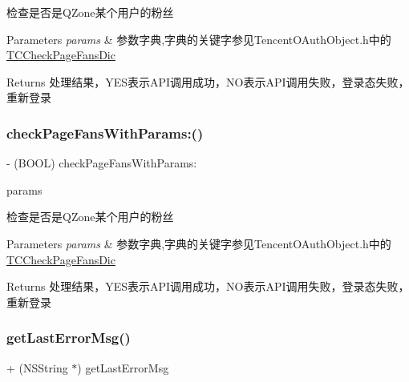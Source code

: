 检查是否是\+Q\+Zone某个用户的粉丝 
\begin{DoxyParams}{Parameters}
{\em params} & 参数字典,字典的关键字参见\+Tencent\+O\+Auth\+Object.\+h中的\mbox{\hyperlink{interface_t_c_check_page_fans_dic}{T\+C\+Check\+Page\+Fans\+Dic}} \\
\hline
\end{DoxyParams}
\begin{DoxyReturn}{Returns}
处理结果，\+Y\+E\+S表示\+A\+P\+I调用成功，\+N\+O表示\+A\+P\+I调用失败，登录态失败，重新登录 
\end{DoxyReturn}
\mbox{\label{interface_tencent_o_auth_aecd70d7b1b09dfce385f4b79f69450c3}} 
\subsubsection{\texorpdfstring{check\+Page\+Fans\+With\+Params\+:()}{checkPageFansWithParams:()}\hspace{0.1cm}{\footnotesize\ttfamily [2/2]}}
{\footnotesize\ttfamily -\/ (B\+O\+OL) check\+Page\+Fans\+With\+Params\+: \begin{DoxyParamCaption}\item[{(N\+S\+Mutable\+Dictionary $\ast$)}]{params }\end{DoxyParamCaption}}

检查是否是\+Q\+Zone某个用户的粉丝 
\begin{DoxyParams}{Parameters}
{\em params} & 参数字典,字典的关键字参见\+Tencent\+O\+Auth\+Object.\+h中的\mbox{\hyperlink{interface_t_c_check_page_fans_dic}{T\+C\+Check\+Page\+Fans\+Dic}} \\
\hline
\end{DoxyParams}
\begin{DoxyReturn}{Returns}
处理结果，\+Y\+E\+S表示\+A\+P\+I调用成功，\+N\+O表示\+A\+P\+I调用失败，登录态失败，重新登录 
\end{DoxyReturn}
\mbox{\label{interface_tencent_o_auth_ada49d962f50bfadf8b3a7eb96420c684}} 
\subsubsection{\texorpdfstring{get\+Last\+Error\+Msg()}{getLastErrorMsg()}\hspace{0.1cm}{\footnotesize\ttfamily [1/2]}}
{\footnotesize\ttfamily + (N\+S\+String $\ast$) get\+Last\+Error\+Msg \begin{DoxyParamCaption}{ }\end{DoxyParamCaption}}

